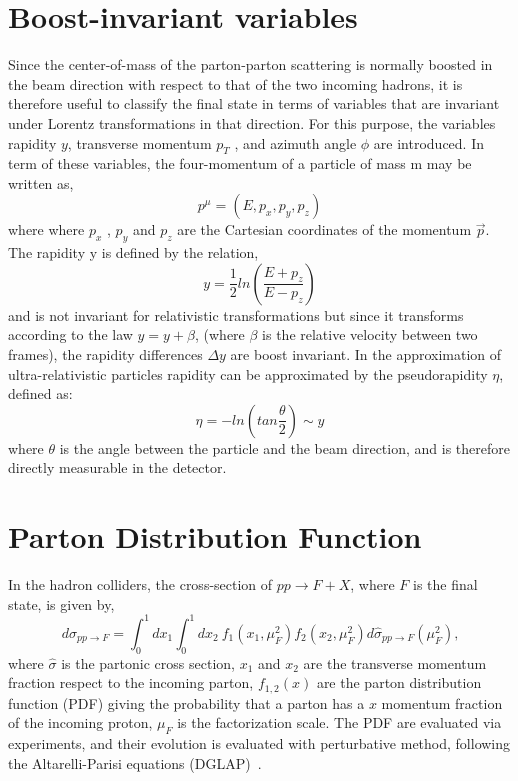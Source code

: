 \documentclass[PhD,binding=0.6cm]{../sapthesis}
\begin{document}
\chapter{Boost-invariant variables}
\label{psr}
Since the center-of-mass of the parton-parton scattering is normally boosted in the beam
direction with respect to that of the two incoming hadrons, it is therefore useful to classify
the final state in terms of variables that are invariant under Lorentz transformations in
that direction. For this purpose, the variables rapidity $y$, transverse momentum $p_T$ , and
azimuth angle $\phi$ are introduced. In term of these variables, the four-momentum of a
particle of mass m may be written as,
\begin{equation}
p^{\mu}=(E,p_x,p_y,p_z)
\end{equation}
where where $p_x$ , $p_y$ and $p_z$ are the Cartesian coordinates of the momentum $\vec{p}$. 
The rapidity y is defined by the relation,
\begin{equation}
y=\frac{1}{2} ln (\frac{E+p_z}{E-p_z})
\end{equation}
and is not invariant for relativistic transformations but since it transforms according to
the law $y = y + \beta$, (where $\beta$ is the relative velocity between two frames), the rapidity
differences $\Delta y$ are boost invariant. In the approximation of ultra-relativistic particles rapidity can be approximated by the pseudorapidity $\eta$, defined as:
\begin{equation}
\eta=- ln (tan \frac{\theta}{2}) \sim y
\end{equation}
where $\theta$ is the angle between the particle and the beam direction, and
is therefore directly measurable in the detector.

\chapter{Parton Distribution Function}
\label{pdfa}
In  the hadron colliders, the cross-section of $pp \to F+X $, where $F$ is the final state, is given by,
\begin{equation}
d \sigma_{pp \rightarrow F} = \int_0 ^1 dx_1 \int_0 ^1 d x_2 \: f_1(x_1, \mu_F^2) f_2(x_2, \mu_F^2) d \hat{\sigma}_{pp \rightarrow F}(\mu_F ^2)  \mbox{,}\end{equation}
where  $\hat{\sigma}$ is the partonic cross section, $x_1$ and  $x_2$ are the transverse momentum fraction respect to the incoming parton,  $f_{1,2}(x)$ are the 
parton distribution function (PDF) giving the probability that a parton has a $x$ momentum fraction of the incoming proton,  $\mu_F$ is the factorization scale.
The PDF are evaluated via experiments, and their evolution is evaluated with perturbative method, following the Altarelli-Parisi equations (DGLAP)~\cite{Altarelli:1977zs}.
\end{document}
